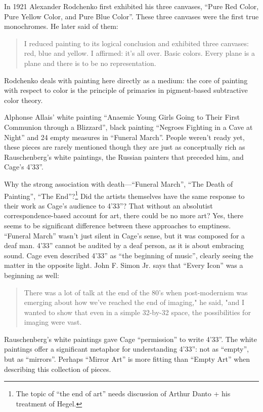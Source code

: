 \documentclass{thesis}
\begin{document}
	\cite{moma_rodchenko_1998}
	In 1921 Alexander Rodchenko first exhibited his three canvases, ``Pure Red Color, Pure Yellow Color, and Pure Blue Color''. These three canvases were the first true monochromes. He later said of them:
	
	\begin{quote}
	I reduced painting to its logical conclusion and exhibited three canvases: red, blue and yellow. I affirmed: it's all over. Basic colors. Every plane is a plane and there is to be no representation.
	\end{quote}
	
	Rodchenko deals with painting here directly as a medium: the core of painting with respect to color is the principle of primaries in pigment-based subtractive color theory.
	
	Alphonse Allais' white painting ``Anaemic Young Girls Going to Their First Communion through a Blizzard'', black painting ``Negroes Fighting in a Cave at Night'' and 24 empty measures in ``Funeral March''. People weren't ready yet, these pieces are rarely mentioned though they are just as conceptually rich as Rauschenberg's white paintings, the Russian painters that preceded him, and Cage's 4'33''.
	
	Why the strong association with death---``Funeral March'', ``The Death of Painting'', ``The End''?\footnote{The topic of ``the end of art'' needs discussion of Arthur Danto + his treatment of Hegel.} Did the artists themselves have the same response to their work as Cage's audience to 4'33''? That without an absolutist correspondence-based account for art, there could be no more art? Yes, there seems to be significant difference between these approaches to emptiness. ``Funeral March'' wasn't just silent in Cage's sense, but it was composed for a deaf man. 4'33'' cannot be audited by a deaf person, as it is about embracing sound. Cage even described 4'33'' as ``the beginning of music'', clearly seeing the matter in the opposite light. John F. Simon Jr. says that ``Every Icon'' was a beginning as well:
	
	\begin{quote}
	There was a lot of talk at the end of the 80's when post-modernism was emerging about how we've reached the end of imaging," he said, "and I wanted to show that even in a simple 32-by-32 space, the possibilities for imaging were vast.\cite{matthew_mirapaul_in_1997}
	\end{quote}
	
	Rauschenberg's white paintings gave Cage ``permission'' to write 4'33''. The white paintings offer a significant metaphor for understanding 4'33'': not as ``empty'', but as ``mirrors''. Perhaps ``Mirror Art'' is more fitting than ``Empty Art'' when describing this collection of pieces.
	
\end{document}
